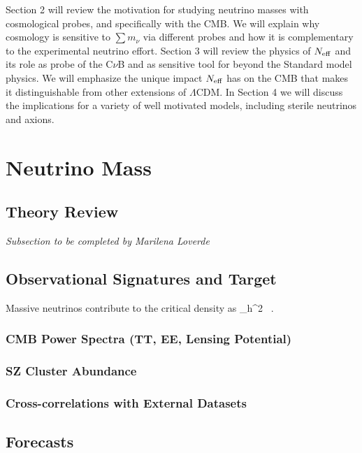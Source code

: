 Section 2 will review the motivation for studying neutrino masses with cosmological probes, and specifically with the CMB.  We will explain why cosmology is sensitive to $\sum m_\nu$ via different probes and how it is complementary to the experimental neutrino effort.  Section 3 will review the physics of $N_{\rm eff}$ and its role as probe of the C$\nu$B and as sensitive tool for beyond the Standard model physics.  We will emphasize the unique impact $N_{\rm eff}$ has on the CMB that makes it distinguishable from other extensions of $\Lambda$CDM.  In Section 4 we will discuss the implications for a variety of well motivated models, including sterile neutrinos and axions.   

\section{Neutrino Mass}

\subsection{Theory Review}

{\it Subsection to be completed by Marilena Loverde}



\subsection{Observational Signatures and Target}

Massive neutrinos contribute to the critical density as
\beq
\Omega_\nu h^2 \simeq {} \ .
\eeq

\subsubsection{CMB Power Spectra (TT, EE, Lensing Potential)}

\subsubsection{SZ Cluster Abundance}

\subsubsection{Cross-correlations with External Datasets}


\subsection{Forecasts}

